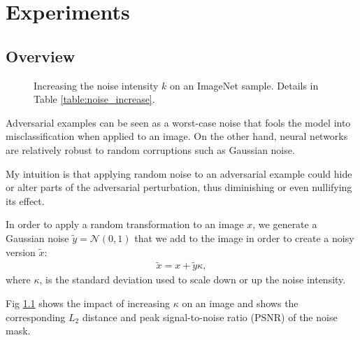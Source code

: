 \chapter{Experiments}
\label{Experiments}
\overridetextsize

\section{Overview}
\label{sec:experiments_overview}

\begin{figure}[!t]
      

      

    \caption{ Increasing the noise intensity $k$ on an ImageNet sample. Details
        in Table \ref{table:noise_increase}.}
    \label{fig:noise_increase}
\end{figure}

Adversarial examples can be seen as a worst-case noise that fools the model into
misclassification when applied to an image. On the other hand, neural networks
are relatively robust to random corruptions such as Gaussian noise.

My intuition is that applying random noise to an adversarial example could hide
or alter parts of the adversarial perturbation, thus diminishing or even
nullifying its effect.

In order to apply a random transformation to an image $x$, we generate a
Gaussian noise $\tilde{y}=\mathcal{N}(0,1)$ that we add to the image in order to
create a noisy version $\tilde{x}$:
\begin{align} \label{eq:noisy_version}
    \tilde{x}=x+\tilde{y}\kappa,
\end{align}
where $\kappa$, is the standard deviation used to scale down or up the noise
intensity.

Fig \ref{fig:noise_increase} shows the impact of increasing $\kappa$ on an image
and shows the corresponding $L_2$ distance and peak signal-to-noise ratio (PSNR)
of the noise mask.

